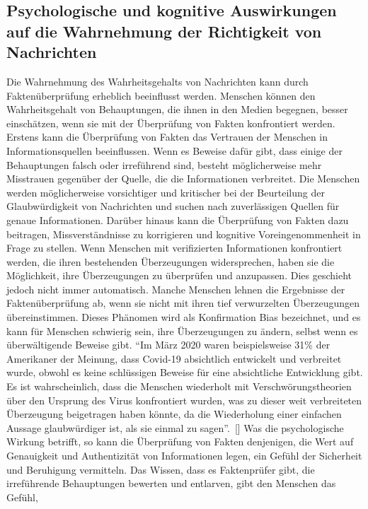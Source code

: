 \documentclass[a4paper,listof=totoc,bibliography=totoc]{scrartcl}
\begin{document}
\subsection{Psychologische und kognitive Auswirkungen auf die Wahrnehmung der Richtigkeit von Nachrichten} 

Die Wahrnehmung des Wahrheitsgehalts von Nachrichten kann durch Faktenüberprüfung erheblich beeinflusst werden. Menschen können den Wahrheitsgehalt von Behauptungen, die 
ihnen in den Medien begegnen, besser einschätzen, wenn sie mit der Überprüfung von Fakten konfrontiert werden. Erstens kann die Überprüfung von Fakten das Vertrauen der 
Menschen in Informationsquellen beeinflussen. Wenn es Beweise dafür gibt, dass einige der Behauptungen falsch oder irreführend sind, besteht möglicherweise mehr Misstrauen 
gegenüber der Quelle, die die Informationen verbreitet. Die Menschen werden möglicherweise vorsichtiger und kritischer bei der Beurteilung der Glaubwürdigkeit von Nachrichten 
und suchen nach zuverlässigen Quellen für genaue Informationen. Darüber hinaus kann die Überprüfung von Fakten dazu beitragen, Missverständnisse zu korrigieren und kognitive 
Voreingenommenheit in Frage zu stellen. Wenn Menschen mit verifizierten Informationen konfrontiert werden, die ihren bestehenden Überzeugungen widersprechen, haben sie die 
Möglichkeit, ihre Überzeugungen zu überprüfen und anzupassen. Dies geschieht jedoch nicht immer automatisch. Manche Menschen lehnen die Ergebnisse der Faktenüberprüfung ab, 
wenn sie nicht mit ihren tief verwurzelten Überzeugungen übereinstimmen. Dieses Phänomen wird als Konfirmation Bias bezeichnet, und es kann für Menschen schwierig sein, ihre 
Überzeugungen zu ändern, selbst wenn es überwältigende Beweise gibt. ``Im März 2020 waren beispielsweise 31\% der Amerikaner der Meinung, dass Covid-19 absichtlich entwickelt 
und verbreitet wurde, obwohl es keine schlüssigen Beweise für eine absichtliche Entwicklung gibt. Es ist wahrscheinlich, dass die Menschen wiederholt mit Verschwörungstheorien 
über den Ursprung des Virus konfrontiert wurden, was zu dieser weit verbreiteten Überzeugung beigetragen haben könnte, da die Wiederholung einer einfachen Aussage glaubwürdiger 
ist, als sie einmal zu sagen''.~[\cite{K.H.Ecker:2022}]
\newline
\newline
Was die psychologische Wirkung betrifft, so kann die Überprüfung von Fakten denjenigen, die Wert auf Genauigkeit und Authentizität von Informationen 
legen, ein Gefühl der Sicherheit und Beruhigung vermitteln. Das Wissen, dass es Faktenprüfer gibt, die irreführende Behauptungen bewerten und entlarven, gibt den Menschen das Gefühl, 
\end{document}
